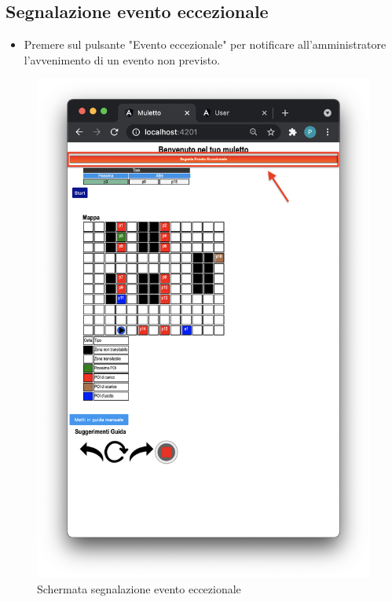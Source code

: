 \subsection{Segnalazione evento eccezionale}
\begin{itemize}
    \item Premere sul pulsante "Evento eccezionale" per notificare all'amministratore l'avvenimento di un evento non previsto.
\end{itemize}
\begin{figure}[H]
    \centering
    \includegraphics[scale=0.45]{res/images/forklift_evento.png}
    \caption{Schermata segnalazione evento eccezionale}
\end{figure}